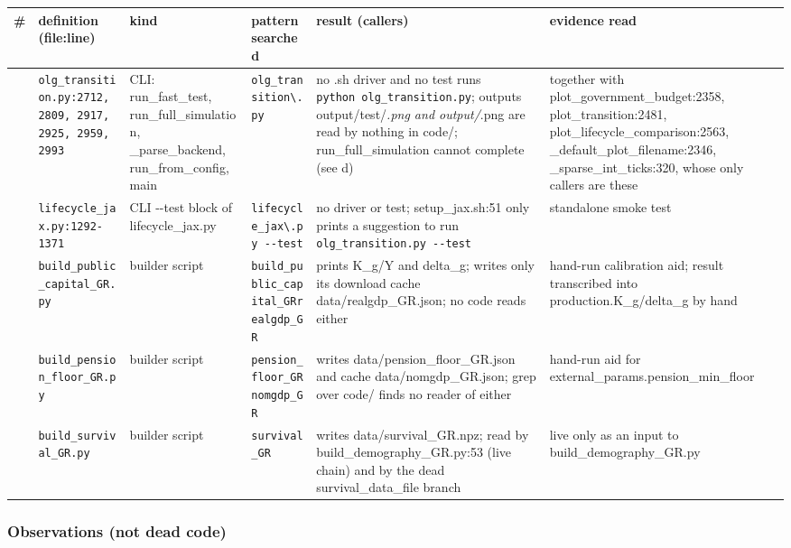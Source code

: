 \begin{longtable}{@{}>{\raggedright\arraybackslash}p{0.5cm}>{\raggedright\arraybackslash}p{3.3cm}>{\raggedright\arraybackslash}p{2.0cm}>{\raggedright\arraybackslash}p{2.5cm}>{\raggedright\arraybackslash}p{4.4cm}>{\raggedright\arraybackslash}p{3.4cm}@{}}
\toprule\noalign{}
\# & definition (file:line) & kind & pattern searched & result (callers)
& evidence read \\
\midrule\noalign{}
\endhead
\bottomrule\noalign{}
\endlastfoot
1 & \texttt{olg\_transition.py:2712,\ 2809,\ 2917,\ 2925,\ 2959,\ 2993}
& CLI: run\_fast\_test, run\_full\_simulation, \_parse\_backend,
run\_from\_config, main & \texttt{olg\_transition\textbackslash{}.py} &
no .sh driver and no test runs \texttt{python\ olg\_transition.py};
outputs output/test/\emph{.png and output/}.png are read by nothing in
code/; run\_full\_simulation cannot complete (see d) & together with
plot\_government\_budget:2358, plot\_transition:2481,
plot\_lifecycle\_comparison:2563, \_default\_plot\_filename:2346,
\_sparse\_int\_ticks:320, whose only callers are these \\
2 & \texttt{lifecycle\_jax.py:1292-1371} & CLI -\/-test block of
lifecycle\_jax.py & \texttt{lifecycle\_jax\textbackslash{}.py\ -\/-test}
& no driver or test; setup\_jax.sh:51 only prints a suggestion to run
\texttt{olg\_transition.py\ -\/-test} & standalone smoke test \\
3 & \texttt{build\_public\_capital\_GR.py} & builder script &
\texttt{build\_public\_capital\_GR\textbar{}realgdp\_GR} & prints K\_g/Y
and delta\_g; writes only its download cache data/realgdp\_GR.json; no
code reads either & hand-run calibration aid; result transcribed into
production.K\_g/delta\_g by hand \\
4 & \texttt{build\_pension\_floor\_GR.py} & builder script &
\texttt{pension\_floor\_GR\textbar{}nomgdp\_GR} & writes
data/pension\_floor\_GR.json and cache data/nomgdp\_GR.json; grep over
code/ finds no reader of either & hand-run aid for
external\_params.pension\_min\_floor \\
5 & \texttt{build\_survival\_GR.py} & builder script &
\texttt{survival\_GR} & writes data/survival\_GR.npz; read by
build\_demography\_GR.py:53 (live chain) and by the dead
survival\_data\_file branch & live only as an input to
build\_demography\_GR.py \\
\end{longtable}

\subsubsection*{Observations (not dead
code)}\label{observations-not-dead-code}

